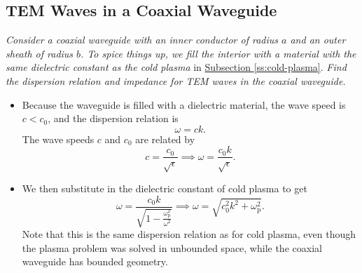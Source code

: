 \documentclass[11pt, a4paper]{article}
\begin{document}
\subsection{TEM Waves in a Coaxial Waveguide}
\textit{Consider a coaxial waveguide with an inner conductor of radius $ a $ and an outer sheath of radius $ b $. To spice things up, we fill the interior with a material with the same dielectric constant as the cold plasma} in \hyperref[ss:cold-plasma]{Subsection \ref{ss:cold-plasma}}. \textit{Find the dispersion relation and impedance for TEM waves in the coaxial waveguide.}
\begin{itemize}
	\item Because the waveguide is filled with a dielectric material, the wave speed is $ c < c_{0} $, and the dispersion relation is
	\begin{equation*}
		\omega = c k.
	\end{equation*}
    The wave speeds $ c $ and $ c_{0} $ are related by
	\begin{equation*}
		c = \frac{c_{0}}{\sqrt{\epsilon}} \implies \omega = \frac{c_{0}k}{\sqrt{\epsilon}}.
	\end{equation*}
	
	\item We then substitute in the dielectric constant of cold plasma to get
	\begin{equation*}
		\omega = \frac{c_{0}k}{\sqrt{1 - \frac{\omega_{\text{p}}^{2}}{\omega^{2}}}} \implies \omega = \sqrt{c_{0}^{2}k^{2} + \omega_{\text{p}}^{2}}.
	\end{equation*}
	Note that this is the same dispersion relation as for cold plasma, even though the plasma problem was solved in unbounded space, while the coaxial waveguide has bounded geometry.
\end{itemize}
\end{document}
